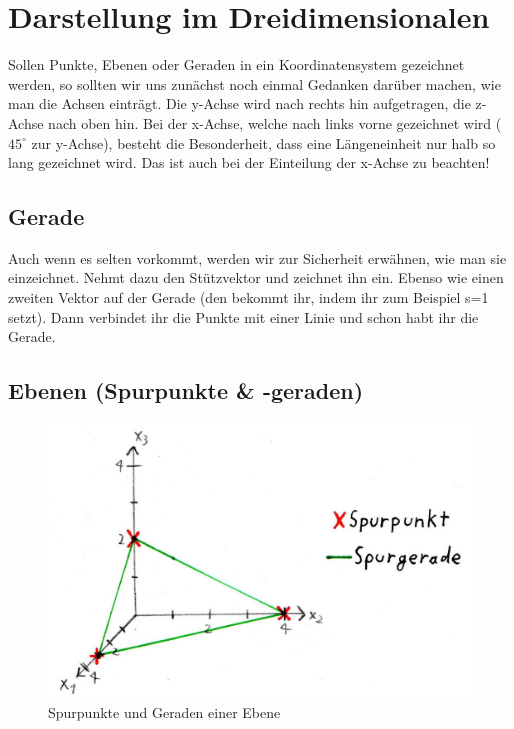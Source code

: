 \section{Darstellung im Dreidimensionalen}
Sollen Punkte, Ebenen oder Geraden in ein Koordinatensystem gezeichnet werden, so sollten wir uns zunächst noch einmal Gedanken darüber machen, wie man die Achsen einträgt. Die y-Achse wird nach rechts hin aufgetragen, die z-Achse nach oben hin. Bei der x-Achse, welche nach links vorne gezeichnet wird (\(45^{\circ}\) zur y-Achse), besteht die Besonderheit, dass eine Längeneinheit nur halb so lang gezeichnet wird. Das ist auch bei der Einteilung der x-Achse zu beachten!

\subsection{Gerade}
Auch wenn es selten vorkommt, werden wir zur Sicherheit erwähnen, wie man sie einzeichnet. Nehmt dazu den Stützvektor und zeichnet ihn ein. Ebenso wie einen zweiten Vektor auf der Gerade (den bekommt ihr, indem ihr zum Beispiel s=1 setzt). Dann verbindet ihr die Punkte mit einer Linie und schon habt ihr die Gerade. 

\subsection{Ebenen (Spurpunkte \& -geraden)}

    \begin{figure}[h]
    \centering
    \includegraphics[scale=0.2]{Images/Spurpunkte.jpeg}
    \caption{Spurpunkte und Geraden einer Ebene}
    \end{figure}

